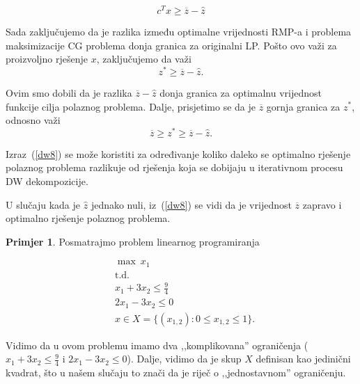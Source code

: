\documentclass[a4paper, utf8, 11pt, colorlinks]{book}
\theoremstyle{definition}
\newtheorem{primjer}{Primjer}[chapter]
\begin{document}
 $$ c^Tx\geqslant \overline{z}-\hat{z}$$
 
 Sada zaključujemo da je razlika između optimalne vrijednosti RMP-a i problema maksimizacije CG  problema donja granica za originalni LP. Pošto ovo važi za proizvoljno rješenje $x$, zaključujemo da važi 
 $$z^*\geqslant \overline{z}-\hat{z}.$$
 
 Ovim smo dobili da je razlika $\overline{z}-\hat{z}$ donja granica za optimalnu vrijednost funkcije cilja polaznog problema. Dalje, prisjetimo se da je $\overline{z}$ gornja granica za $z^*$, odnosno važi 
\begin{equation}\label{dw8}
	  \overline{z}\geqslant z^*\geqslant \overline{z}-\hat{z}.
\end{equation}
 
 Izraz~(\ref{dw8}) se može koristiti za određivanje koliko daleko se optimalno rješenje polaznog problema razlikuje od rješenja koja se dobijaju u iterativnom procesu DW dekompozicije.
 
 U slučaju kada je $\hat{z}$ jednako nuli, iz~(\ref{dw8}) se vidi da je vrijednost $\overline{z}$ zapravo i optimalno rješenje polaznog problema.
 
\begin{primjer}%
 
 Posmatrajmo problem linearnog programiranja
 \end{primjer}
   \begin{equation}
 	\begin{aligned}\label{primjer:dw1}
 		&\max\  x_1\\
 		&\mbox{t.d.}\\  
 		&x_1+3x_2\leqslant \frac94\\
 		 &2x_1-3x_2\leqslant 0\\
 		&x \in X=\{(x_{1,2}):0\leqslant x_{1, 2}  \leqslant 1\}.
 	\end{aligned}
 \end{equation}
 
 Vidimo da u ovom problemu imamo dva ,,komplikovana'' ograničenja ($x_1+3x_2\leqslant \frac94$ i
 $2x_1-3x_2\leqslant 0$). Dalje, vidimo da je skup $X$ definisan kao jedinični kvadrat, što u našem slučaju to znači da je riječ o ,,jednostavnom'' ograničenju. 
 
\end{document}
